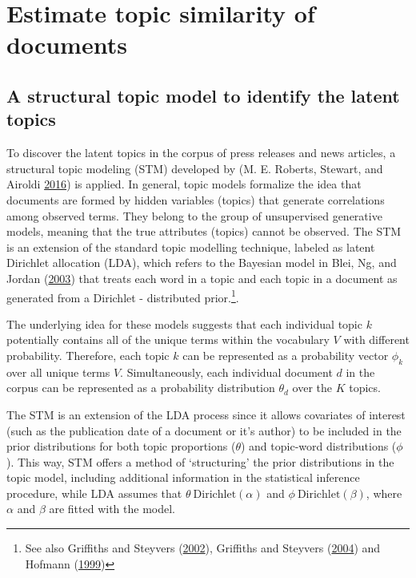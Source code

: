 \documentclass[
]{article}
\begin{document}
\hypertarget{estimate-topic-similarity-of-documents}{%
\section{Estimate topic similarity of
documents}\label{estimate-topic-similarity-of-documents}}

\hypertarget{a-structural-topic-model-to-identify-the-latent-topics}{%
\subsection{A structural topic model to identify the latent
topics}\label{a-structural-topic-model-to-identify-the-latent-topics}}

To discover the latent topics in the corpus of press releases and news
articles, a structural topic modeling (STM) developed by (M. E. Roberts,
Stewart, and Airoldi \protect\hyperlink{ref-roberts_model_2016}{2016})
is applied. In general, topic models formalize the idea that documents
are formed by hidden variables (topics) that generate correlations among
observed terms. They belong to the group of unsupervised generative
models, meaning that the true attributes (topics) cannot be observed.
The STM is an extension of the standard topic modelling technique,
labeled as latent Dirichlet allocation (LDA), which refers to the
Bayesian model in Blei, Ng, and Jordan
(\protect\hyperlink{ref-blei_latent_2003}{2003}) that treats each word
in a topic and each topic in a document as generated from a Dirichlet -
distributed prior.\footnote{See also Griffiths and Steyvers
  (\protect\hyperlink{ref-griffiths_probabilistic_2002}{2002}),
  Griffiths and Steyvers
  (\protect\hyperlink{ref-griffiths_finding_2004}{2004}) and Hofmann
  (\protect\hyperlink{ref-hofmann_probabilistic_1999}{1999})}.

The underlying idea for these models suggests that each individual topic
\(k\) potentially contains all of the unique terms within the vocabulary
\(V\) with different probability. Therefore, each topic \(k\) can be
represented as a probability vector \(\phi_k\) over all unique terms
\(V\). Simultaneously, each individual document \(d\) in the corpus can
be represented as a probability distribution \(\theta_d\) over the \(K\)
topics.

The STM is an extension of the LDA process since it allows covariates of
interest (such as the publication date of a document or it's author) to
be included in the prior distributions for both topic proportions
(\(\theta\)) and topic-word distributions (\(\phi\)). This way, STM
offers a method of `structuring' the prior distributions in the topic
model, including additional information in the statistical inference
procedure, while LDA assumes that \(\theta ~ \text{Dirichlet}(\alpha)\)
and \(\phi ~ \text{Dirichlet}(\beta)\), where \(\alpha\) and \(\beta\)
are fitted with the model.
\end{document}
